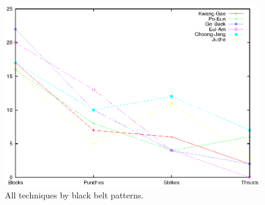 \documentclass[10pt,twocolumn,a4paper]{article}
\newcommand{\Section}[1]{\vspace{-8pt}\section{\hskip -1em.~~#1}\vspace{-3pt}}
\begin{document}
  \begin{figure}
    \includegraphics[scale=0.72]{data/gnuplot/eps/patterns_black_all}
    \caption{All techniques by black belt patterns.}
    \label{fig:patterns_black_all}
  \end{figure}
















\end{document}
